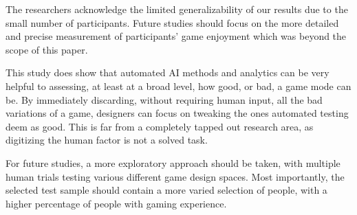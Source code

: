 The researchers acknowledge the limited generalizability of our results due to the small number of participants. Future studies should focus on the more detailed and precise measurement of participants’ game enjoyment which was beyond the scope of this paper.

This study does show that automated AI methods and analytics can be very helpful to assessing, at least at a broad level, how good, or bad, a game mode can be. By immediately discarding, without requiring human input, all the bad variations of a game, designers can focus on tweaking the ones automated testing deem as good. This is far from a completely tapped out research area, as digitizing the human factor is not a solved task.

For future studies, a more exploratory approach should be taken, with multiple human trials testing various different game design spaces. Most importantly, the selected test sample should contain a more varied selection of people, with a higher percentage of people with gaming experience.